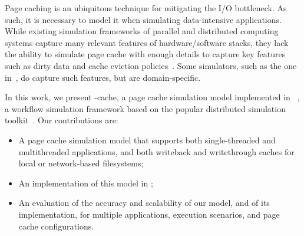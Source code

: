 Page caching is an ubiquitous technique for mitigating the I/O bottleneck.
As such, it is necessary to model it
when simulating data-intensive applications.
While existing simulation frameworks of parallel and distributed computing
systems  capture many relevant features of hardware/software stacks, 
they lack the ability to simulate page cache with enough details to capture key features such
as dirty data and cache eviction policies~\cite{nunez2012simcan,nunez2012icancloud}. 
Some simulators, such as the one in~\cite{xu2018saving}, do capture such features,
but are domain-specific. 


In this work, we present \wrench-cache, a page cache simulation model
implemented in \wrench~\cite{casanova2020fgcs}, a workflow simulation
framework based on the popular \simgrid distributed simulation
toolkit~\cite{casanova2014simgrid}. Our contributions are:

\begin{itemize}
    \item A page cache simulation model that supports 
both single-threaded and multithreaded applications, and both
writeback and writethrough caches for local or network-based
filesystems;
    \item An implementation of this model in \wrench; 
    \item An evaluation of the accuracy and scalability of our model, and of its implementation,
          for multiple applications, execution scenarios, and page cache configurations. 
\end{itemize}
